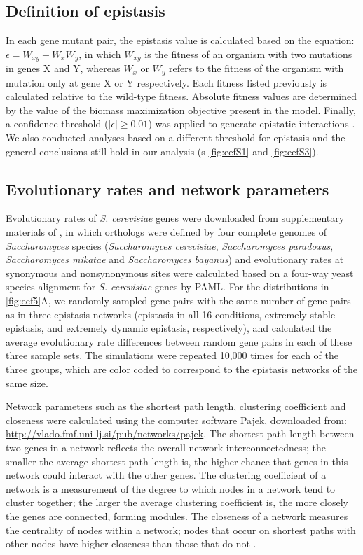 \subsection{Definition of epistasis}

In each gene mutant pair, the epistasis value is calculated based on
the equation: $\epsilon = W_{xy} - W_xW_y$, in which $W_{xy}$ is the
fitness of an organism with two mutations in genes X and Y, whereas
$W_{x}$ or $W_{y}$ refers to the fitness of the organism with mutation
only at gene X or Y respectively. Each fitness listed previously is
calculated relative to the wild-type fitness. Absolute fitness values
are determined by the value of the biomass maximization objective
present in the model. Finally, a confidence threshold
($\left|\epsilon\right| \geq 0.01$) was applied to generate epistatic
interactions \citep{Xu2012, Costanzo2010, He2010}. We also conducted
analyses based on a different threshold for epistasis and the general
conclusions still hold in our analysis (\Fig s \ref{fig:eefS1} and
\ref{fig:eefS3}).

\subsection{Evolutionary rates and network parameters}

Evolutionary rates of \textit{S. cerevisiae} genes were downloaded
from supplementary materials of \citealt{Wall2005}, in which orthologs were
defined by four complete genomes of \textit{Saccharomyces} species
(\textit{Saccharomyces cerevisiae}, \textit{Saccharomyces paradoxus},
\textit{Saccharomyces mikatae} and \textit{Saccharomyces bayanus}) and
evolutionary rates at synonymous and nonsynonymous sites were
calculated based on a four-way yeast species alignment for
\textit{S. cerevisiae} genes by PAML. For the distributions in
\ref{fig:eef5}A, we randomly sampled gene pairs with the same number
of gene pairs
as in three epistasis networks (epistasis in all 16 conditions,
extremely stable epistasis, and extremely dynamic epistasis,
respectively), and calculated the average evolutionary rate
differences between random gene pairs in each of these three sample
sets. The simulations were repeated 10,000 times for each of the three
groups, which are color coded to correspond to the epistasis networks
of the same size.

Network parameters such as the shortest path length, clustering
coefficient and closeness were calculated using the computer software
Pajek, downloaded from:
\url{http://vlado.fmf.uni-lj.si/pub/networks/pajek}. The shortest path
length between two genes in a network reflects the overall network
interconnectedness; the smaller the average shortest path length is,
the higher chance that genes in this network could interact with the
other genes. The clustering coefficient of a network is a measurement
of the degree to which nodes in a network tend to cluster together;
the larger the average clustering coefficient is, the more closely the
genes are connected, forming modules. The closeness of a network
measures the centrality of nodes within a network; nodes that occur on
shortest paths with other nodes have higher closeness than those that
do not \citep{Barabasi2004}.

